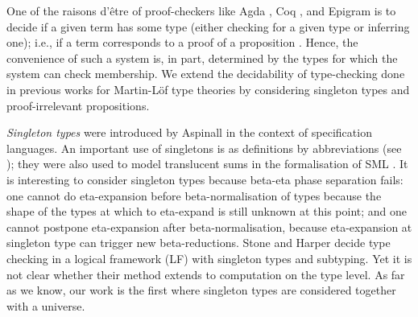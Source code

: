 \documentclass{LMCS}
\newcommand{\LONGVERSION}[1]{}
\begin{document}
\noindent One of the raisons d'\^{e}tre of
proof-checkers like Agda \cite{norell:PhD}, Coq \cite{coq81}, and
Epigram \cite{mcBride:afp04} is to decide if a given term has some
type (either checking for a given type or inferring one); i.e., if
a term corresponds to a proof of a proposition
\cite{harperHonsellPlotkin:LF}.  Hence, the convenience of such a
system is, in part, determined by the types for which the system can
check membership. We extend the decidability of type-checking done in
previous works \cite{abelAehligDybjer:mfps07,abelCoquandDybjer:lics07}
for Martin-L\"{o}f type theories \cite{mlitt,nordstroem:mltt} by
considering singleton types and proof-irrelevant propositions.

\LONGVERSION{We consider a type theory with a \emph{universe}, which
  allows large eliminations, i.e., types defined by recursion on
  natural numbers. 
The universe of small types was introduced by
  Martin-L\"{o}f \cite{martinlof72} for formalising category theory.
Martin-L\"of presents universes in two different styles \cite{mlitt}: 
  {\em \`a la Russell} (the one considered here), and {\em \`a la Tarski}.}

\emph{Singleton types} were introduced by Aspinall \cite{aspinall:csl94} in
the context of specification languages. An important use of singletons
is as definitions by abbreviations (see
\cite{aspinall:csl94,coquandPollackTakeyama:fundinf05}); they were
also used to model translucent sums in the formalisation of SML
\cite{harper:popl07}.  It is interesting to consider singleton types
because beta-eta phase separation fails: one cannot do eta-expansion before
beta-normalisation of types because the shape of the types at which to
eta-expand is still unknown at this point; and one cannot postpone
eta-expansion after beta-normalisation, because eta-expansion at
singleton type can
trigger new beta-reductions. 
Stone and Harper \cite{stoneHarper:tocl06} decide type checking in a
logical framework (LF) with singleton types and subtyping.  Yet it is not clear
whether their method extends to computation on the type level.  As far
as we know, our work is the first where singleton types are considered
together with a universe.
\end{document}
